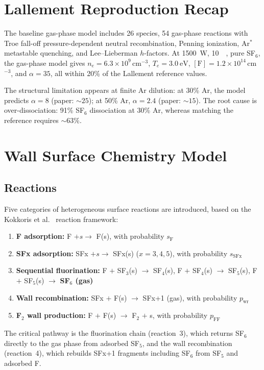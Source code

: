 \documentclass[11pt,a4paper]{report}
\newcommand{\Te}{T_e}
\begin{document}
\section{Lallement Reproduction Recap}
\label{sec:wall_recap}

The baseline gas-phase model includes 26 species, 54 gas-phase reactions with Troe fall-off pressure-dependent neutral recombination, Penning ionization, Ar$^*$ metastable quenching, and Lee--Lieberman $h$-factors.  At \SI{1500}{\watt}, \SI{10}{\milli\torr}, pure SF$_6$, the gas-phase model gives $n_e = 6.3\times10^9$\,cm$^{-3}$, $\Te = \SI{3.0}{\electronvolt}$, $[\mathrm{F}]= 1.2\times10^{14}$\,cm$^{-3}$, and $\alpha = 35$, all within 20\% of the Lallement reference values.

The structural limitation appears at finite Ar dilution: at 30\% Ar, the model predicts $\alpha = 8$ (paper: ${\sim}25$); at 50\% Ar, $\alpha = 2.4$ (paper: ${\sim}15$).  The root cause is over-dissociation: 91\% SF$_6$ dissociation at 30\% Ar, whereas matching the reference requires ${\sim}63\%$.

\section{Wall Surface Chemistry Model}
\label{sec:wall_model}

\subsection{Reactions}
\label{sec:wall_reactions}

Five categories of heterogeneous surface reactions are introduced, based on the Kokkoris et al.~\cite{Kokkoris2009} reaction framework:
\begin{enumerate}[nosep]
\item \textbf{F adsorption:} F $+ s \to$ F(s), with probability $s_\mathrm{F}$
\item \textbf{SFx adsorption:} SFx $+ s \to$ SFx(s) ($x = 3, 4, 5$), with probability $s_\mathrm{SFx}$
\item \textbf{Sequential fluorination:} F $+$ SF$_3$(s) $\to$ SF$_4$(s), \; F $+$ SF$_4$(s) $\to$ SF$_5$(s), \; F $+$ SF$_5$(s) $\to$ \textbf{SF$_6$ (gas)}
\item \textbf{Wall recombination:} SFx $+$ F(s) $\to$ SFx+1 (gas), with probability $p_\mathrm{wr}$
\item \textbf{F$_2$ wall production:} F $+$ F(s) $\to$ F$_2$ $+$ s, with probability $p_\mathrm{FF}$
\end{enumerate}
The critical pathway is the fluorination chain (reaction~3), which returns SF$_6$ directly to the gas phase from adsorbed SF$_5$, and the wall recombination (reaction~4), which rebuilds SFx+1 fragments including SF$_6$ from SF$_5$ and adsorbed F.
\end{document}
